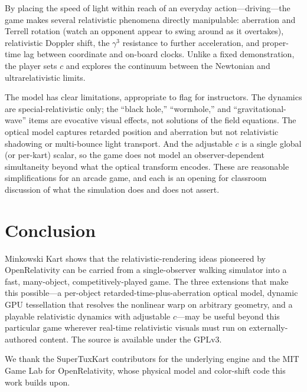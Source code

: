 \documentclass[aip,amsmath,amssymb,reprint,nofootinbib]{revtex4-2}
\begin{document}
By placing the speed of light within reach of an everyday action---driving---the
game makes several relativistic phenomena directly manipulable: aberration and
Terrell rotation (watch an opponent appear to swing around as it overtakes),
relativistic Doppler shift, the $\gamma^3$ resistance to further acceleration,
and proper-time lag between coordinate and on-board clocks. Unlike a fixed
demonstration, the player sets $c$ and explores the continuum between the
Newtonian and ultrarelativistic limits.

The model has clear limitations, appropriate to flag for instructors. The
dynamics are special-relativistic only; the ``black hole,'' ``wormhole,'' and
``gravitational-wave'' items are evocative visual effects, not solutions of the
field equations. The optical model captures retarded position and aberration but
not relativistic shadowing or multi-bounce light transport. And the adjustable
$c$ is a single global (or per-kart) scalar, so the game does not model an
observer-dependent simultaneity beyond what the optical transform encodes. These
are reasonable simplifications for an arcade game, and each is an opening for
classroom discussion of what the simulation does and does not assert.

\section{Conclusion}

Minkowski Kart shows that the relativistic-rendering ideas pioneered by
OpenRelativity can be carried from a single-observer walking simulator into a
fast, many-object, competitively-played game. The three extensions that make
this possible---a per-object retarded-time-plus-aberration optical model, dynamic
GPU tessellation that resolves the nonlinear warp on arbitrary geometry, and a
playable relativistic dynamics with adjustable $c$---may be useful beyond this
particular game wherever real-time relativistic visuals must run on
externally-authored content. The source is available under the GPLv3.

\begin{acknowledgments}
We thank the SuperTuxKart contributors for the underlying engine and the MIT Game
Lab for OpenRelativity, whose physical model and color-shift code this work
builds upon.
\end{acknowledgments}
\end{document}
